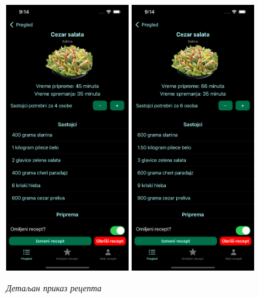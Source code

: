 \documentclass[12pt,oneside]{memoir}
\begin{document}
\begin{figure} [H]
    \centering
    \captionsetup{justification=centering}
    \includegraphics[width=0.475\textwidth]{images/simulators/testing images/detail recipe 4.png}
    \hfill
    \includegraphics[width=0.475\textwidth]{images/simulators/testing images/detail recipe 6.png}
    \caption{\textit{Детаљан приказ рецепта}}
    \label{slika:детаљан_приказ_рецепта}
\end{figure}
\end{document}
